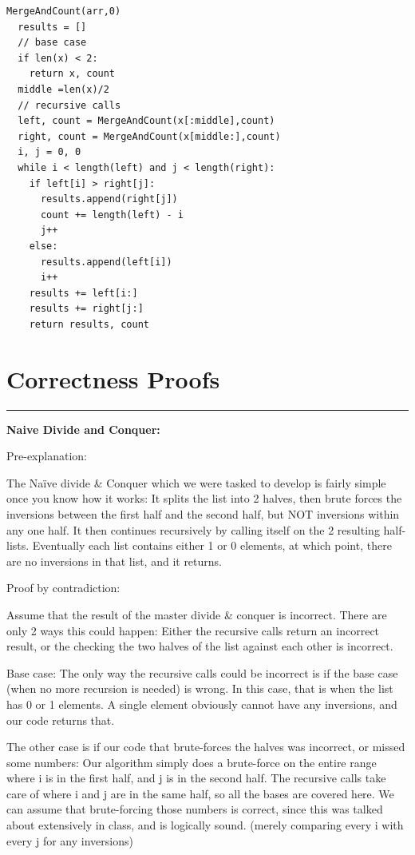 \documentclass[letterpaper,10pt,titlepage,fleqn]{article}
\begin{document}
\begin{lstlisting}
MergeAndCount(arr,0)
  results = []
  // base case
  if len(x) < 2:
    return x, count
  middle =len(x)/2
  // recursive calls
  left, count = MergeAndCount(x[:middle],count)
  right, count = MergeAndCount(x[middle:],count)
  i, j = 0, 0
  while i < length(left) and j < length(right):
    if left[i] > right[j]:
      results.append(right[j])
      count += length(left) - i
      j++
    else:
      results.append(left[i])
      i++
    results += left[i:]
    results += right[j:]
    return results, count
\end{lstlisting}

\section*{Correctness Proofs}
\hrule

\begin{centering}
\textbf{Naive Divide and Conquer:}
\end{centering}

Pre-explanation:

The Naïve divide \& Conquer which we were tasked to develop is fairly simple once you know how it works:  It splits the list into 2 halves, then brute forces the inversions between the first half and the second half, but NOT inversions within any one half.  It then continues recursively by calling itself on the 2 resulting half-lists.  Eventually each list contains either 1 or 0 elements, at which point, there are no inversions in that list, and it returns.

Proof by contradiction:

Assume that the result of the master divide \& conquer is incorrect.  There are only 2 ways this could happen:  Either the recursive calls return an incorrect result, or the checking the two halves of the list against each other is incorrect.

Base case:  The only way the recursive calls could be incorrect is if the base case (when no more recursion is needed) is wrong.  In this case, that is when the list has 0 or 1 elements.  A single element obviously cannot have any inversions, and our code returns that.
        
The other case is if our code that brute-forces the halves was incorrect, or missed some numbers:  Our algorithm simply does a brute-force on the entire range where i is in the first half, and j is in the second half.  The recursive calls take care of where i and j are in the same half, so all the bases are covered here.  We can assume that brute-forcing those numbers is correct, since this was talked about extensively in class, and is logically sound. (merely comparing every i with every j for any inversions)
\end{document}
